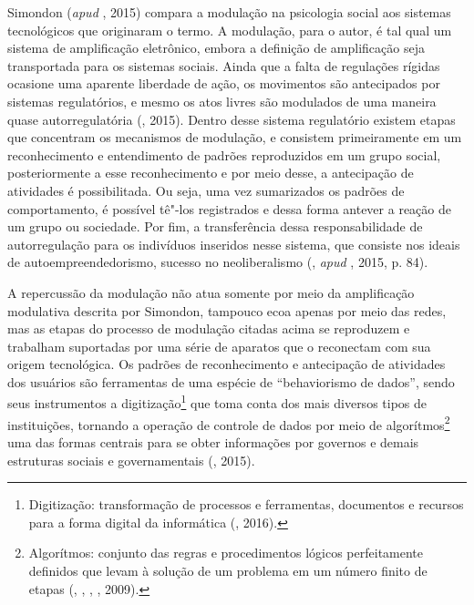 Simondon (\emph{apud} , 2015) compara a modulação na psicologia social
aos sistemas tecnológicos que originaram o termo. A modulação, para o
autor, é tal qual um sistema de amplificação eletrônico, embora a
definição de amplificação seja transportada para os sistemas sociais.
Ainda que a falta de regulações rígidas ocasione uma aparente liberdade
de ação, os movimentos são antecipados por sistemas regulatórios, e
mesmo os atos livres são modulados de uma maneira quase autorregulatória
(, 2015). Dentro desse sistema regulatório existem etapas que
concentram os mecanismos de modulação, e consistem primeiramente em um
reconhecimento e entendimento de padrões reproduzidos em um grupo
social, posteriormente a esse reconhecimento e por meio desse, a
antecipação de atividades é possibilitada. Ou seja, uma vez sumarizados
os padrões de comportamento, é possível tê"-los registrados e dessa forma
antever a reação de um grupo ou sociedade. Por fim, a transferência
dessa responsabilidade de autorregulação para os indivíduos inseridos
nesse sistema, que consiste nos ideais de autoempreendedorismo, sucesso
no neoliberalismo (, \emph{apud} , 2015, p. 84).

A repercussão da modulação não atua somente por meio da amplificação
modulativa descrita por Simondon, tampouco ecoa apenas por meio das
redes, mas as etapas do processo de modulação citadas acima se
reproduzem e trabalham suportadas por uma série de aparatos que o
reconectam com sua origem tecnológica. Os padrões de reconhecimento e
antecipação de atividades dos usuários são ferramentas de uma espécie de
``behaviorismo de dados'', sendo seus instrumentos a
digitização\footnote{Digitização: transformação de processos e
  ferramentas, documentos e recursos para a forma digital da informática
  (, 2016).} que toma conta dos mais diversos tipos de
instituições, tornando a operação de controle de dados por meio de
algorítmos\footnote{Algorítmos: conjunto das regras e procedimentos
  lógicos perfeitamente definidos que levam à solução de um problema em
  um número finito de etapas (, , , , 2009).} uma das formas centrais para se obter
informações por governos e demais estruturas sociais e governamentais
(, 2015).

